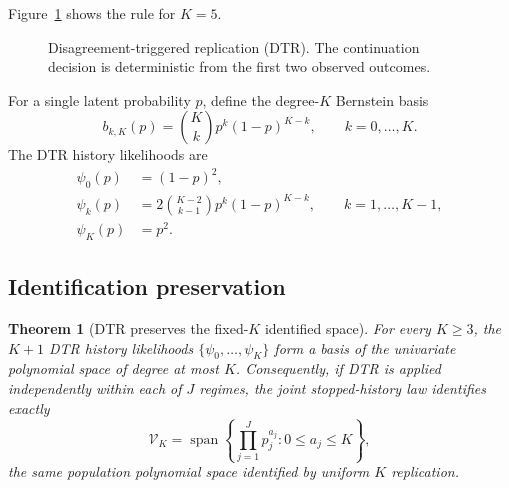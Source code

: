 \documentclass[11pt]{article}
\newtheorem{theorem}{Theorem}
\theoremstyle{remark}
\newcommand{\calV}{\mathcal{V}}
\begin{document}
Figure~\ref{fig:dtr} shows the rule for $K=5$.

\begin{figure}[H]
\centering
{}
\caption{Disagreement-triggered replication (DTR). The continuation decision is deterministic from the first two observed outcomes.}
\label{fig:dtr}
\end{figure}

For a single latent probability $p$, define the degree-$K$ Bernstein basis
\[
 b_{k,K}(p)={K\choose k}p^k(1-p)^{K-k},\qquad k=0,\ldots,K.
\]
The DTR history likelihoods are
\begin{align*}
 \psi_0(p)&=(1-p)^2,\\
 \psi_k(p)&=2{K-2\choose k-1}p^k(1-p)^{K-k},\qquad k=1,\ldots,K-1,\\
 \psi_K(p)&=p^2.
\end{align*}

\subsection{Identification preservation}

\begin{theorem}[DTR preserves the fixed-$K$ identified space]\label{thm:basis}
For every $K\ge3$, the $K+1$ DTR history likelihoods $\{\psi_0,\ldots,\psi_K\}$ form a basis of the univariate polynomial space of degree at most $K$. Consequently, if DTR is applied independently within each of $J$ regimes, the joint stopped-history law identifies exactly
\[
 \calV_K=\operatorname{span}\left\{\prod_{j=1}^Jp_j^{a_j}:0\le a_j\le K\right\},
\]
the same population polynomial space identified by uniform $K$ replication.
\end{theorem}
\end{document}
